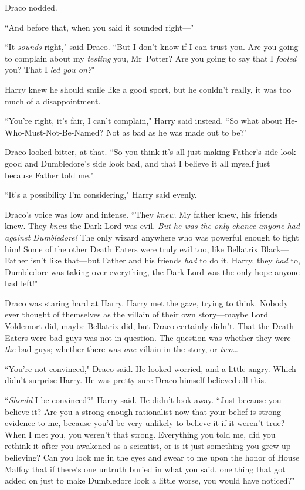 Draco nodded.

``And before that, when you said it sounded right—"

``It \emph{sounds} right," said Draco. ``But I don't know if I can trust you. Are you going to complain about my \emph{testing} you, Mr~Potter? Are you going to say that I \emph{fooled} you? That I \emph{led you on?}"

Harry knew he should smile like a good sport, but he couldn't really, it was too much of a disappointment.

``You're right, it's fair, I can't complain," Harry said instead. ``So what about He-Who-Must-Not-Be-Named? Not as bad as he was made out to be?"

Draco looked bitter, at that. ``So you think it's all just making Father's side look good and Dumbledore's side look bad, and that I believe it all myself just because Father told me."

``It's a possibility I'm considering," Harry said evenly.

Draco's voice was low and intense. ``They \emph{knew}. My father knew, his friends knew. They \emph{knew} the Dark Lord was evil. \emph{But he was the only chance anyone had against Dumbledore!} The only wizard anywhere who was powerful enough to fight him! Some of the other Death Eaters were truly evil too, like Bellatrix Black—Father isn't like that—but Father and his friends \emph{had} to do it, Harry, they \emph{had} to, Dumbledore was taking over everything, the Dark Lord was the only hope anyone had left!"

Draco was staring hard at Harry. Harry met the gaze, trying to think. Nobody ever thought of themselves as the villain of their own story—maybe Lord Voldemort did, maybe Bellatrix did, but Draco certainly didn't. That the Death Eaters were bad guys was not in question. The question was whether they were \emph{the} bad guys; whether there was \emph{one} villain in the story, or \emph{two{\ldots}}

``You're not convinced," Draco said. He looked worried, and a little angry. Which didn't surprise Harry. He was pretty sure Draco himself believed all this.

``\emph{Should} I be convinced?" Harry said. He didn't look away. ``Just because you believe it? Are you a strong enough rationalist now that your belief is strong evidence to me, because you'd be very unlikely to believe it if it weren't true? When I met you, you weren't that strong. Everything you told me, did you rethink it after you awakened as a scientist, or is it just something you grew up believing? Can you look me in the eyes and swear to me upon the honor of House Malfoy that if there's one untruth buried in what you said, one thing that got added on just to make Dumbledore look a little worse, you would have noticed?"

